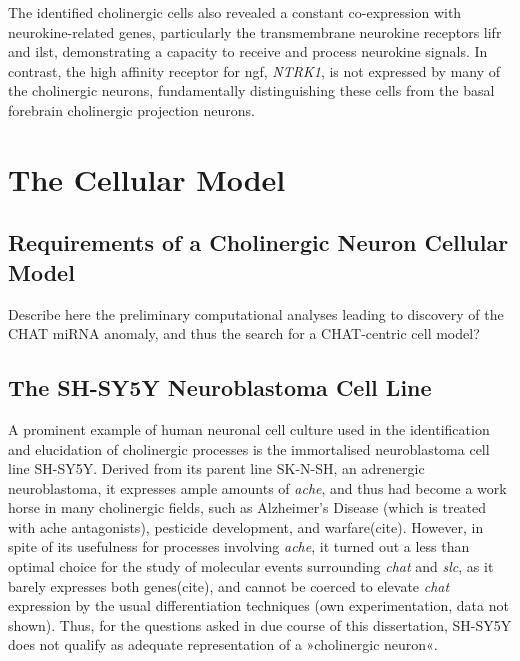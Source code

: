 The identified cholinergic cells also revealed a constant co-expression with neurokine-related genes, particularly the transmembrane neurokine receptors \ac{lifr} and \ac{ilst}, demonstrating a capacity to receive and process neurokine signals. In contrast, the high affinity receptor for \ac{ngf}, \textit{NTRK1}, is not expressed by many of the cholinergic neurons, fundamentally distinguishing these cells from the basal forebrain cholinergic projection neurons.

\section{The Cellular Model}
\subsection{Requirements of a Cholinergic Neuron Cellular Model} \label{sec:cellculture:model}
Describe here the preliminary computational analyses leading to discovery of the CHAT miRNA anomaly, and thus the search for a CHAT-centric cell model? 
\subsection{The SH-SY5Y Neuroblastoma Cell Line}
A prominent example of human neuronal cell culture used in the identification and elucidation of cholinergic processes is the immortalised neuroblastoma cell line SH-SY5Y\cite{Biedler1978}. Derived from its parent line SK-N-SH, an adrenergic neuroblastoma\cite{Biedler1973}, it expresses ample amounts of \textit{\ac{ache}}, and thus had become a work horse in many cholinergic fields, such as Alzheimer's Disease (which is treated with \ac{ache} antagonists), pesticide development, and warfare(cite). However, in spite of its usefulness for processes involving \textit{\ac{ache}}, it turned out a less than optimal choice for the study of molecular events surrounding \textit{\ac{chat}} and \textit{\ac{slc}}, as it barely expresses both genes(cite), and cannot be coerced to elevate \textit{\ac{chat}} expression by the usual differentiation techniques (own experimentation, data not shown). Thus, for the questions asked in due course of this dissertation, SH-SY5Y does not qualify as adequate representation of a »cholinergic neuron«.

